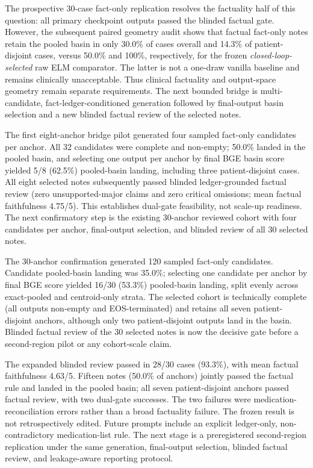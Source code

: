 \documentclass[11pt]{article}
\begin{document}
The prospective 30-case fact-only replication resolves the factuality half of this question: all primary checkpoint outputs passed the blinded factual gate. However, the subsequent paired geometry audit shows that factual fact-only notes retain the pooled basin in only 30.0\% of cases overall and 14.3\% of patient-disjoint cases, versus 50.0\% and 100\%, respectively, for the frozen \emph{closed-loop-selected} raw ELM comparator. The latter is not a one-draw vanilla baseline and remains clinically unacceptable. Thus clinical factuality and output-space geometry remain separate requirements. The next bounded bridge is multi-candidate, fact-ledger-conditioned generation followed by final-output basin selection and a new blinded factual review of the selected notes.

The first eight-anchor bridge pilot generated four sampled fact-only candidates per anchor. All 32 candidates were complete and non-empty; 50.0\% landed in the pooled basin, and selecting one output per anchor by final BGE basin score yielded 5/8 (62.5\%) pooled-basin landing, including three patient-disjoint cases. All eight selected notes subsequently passed blinded ledger-grounded factual review (zero unsupported-major claims and zero critical omissions; mean factual faithfulness 4.75/5). This establishes dual-gate feasibility, not scale-up readiness. The next confirmatory step is the existing 30-anchor reviewed cohort with four candidates per anchor, final-output selection, and blinded review of all 30 selected notes.

The 30-anchor confirmation generated 120 sampled fact-only candidates. Candidate pooled-basin landing was 35.0\%; selecting one candidate per anchor by final BGE score yielded 16/30 (53.3\%) pooled-basin landing, split evenly across exact-pooled and centroid-only strata. The selected cohort is technically complete (all outputs non-empty and EOS-terminated) and retains all seven patient-disjoint anchors, although only two patient-disjoint outputs land in the basin. Blinded factual review of the 30 selected notes is now the decisive gate before a second-region pilot or any cohort-scale claim.

The expanded blinded review passed in 28/30 cases (93.3\%), with mean factual faithfulness 4.63/5. Fifteen notes (50.0\% of anchors) jointly passed the factual rule and landed in the pooled basin; all seven patient-disjoint anchors passed factual review, with two dual-gate successes. The two failures were medication-reconciliation errors rather than a broad factuality failure. The frozen result is not retrospectively edited. Future prompts include an explicit ledger-only, non-contradictory medication-list rule. The next stage is a preregistered second-region replication under the same generation, final-output selection, blinded factual review, and leakage-aware reporting protocol.
\end{document}
